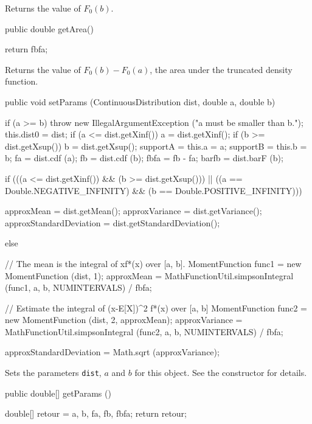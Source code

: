 \begin{tabb}   Returns the value of $F_0(b)$.
\end{tabb}
\begin{code}

   public double getArea()\begin{hide} {
      return fbfa;
   }
\end{hide}
\end{code}
\begin{tabb}  Returns the value of $F_0(b) - F_0(a)$,
  the area under the truncated density function.
\end{tabb}
\begin{code}

   public void setParams (ContinuousDistribution dist, double a, double b)\begin{hide} {
      if (a >= b)
         throw new IllegalArgumentException ("a must be smaller than b.");
      this.dist0 = dist;
      if (a <= dist.getXinf())
         a = dist.getXinf();
      if (b >= dist.getXsup())
         b = dist.getXsup();
      supportA = this.a = a;
      supportB = this.b = b;
      fa = dist.cdf (a);
      fb = dist.cdf (b);
      fbfa = fb - fa;
      barfb = dist.barF (b);

      if (((a <= dist.getXinf()) && (b >= dist.getXsup())) ||
       ((a == Double.NEGATIVE_INFINITY) && (b == Double.POSITIVE_INFINITY))) {
         approxMean = dist.getMean();
         approxVariance = dist.getVariance();
         approxStandardDeviation = dist.getStandardDeviation();

      } else {
         // The mean is the integral of xf*(x) over [a, b].
         MomentFunction func1 = new MomentFunction (dist, 1);
         approxMean = MathFunctionUtil.simpsonIntegral (func1, a, b, NUMINTERVALS) / fbfa;

         // Estimate the integral of (x-E[X])^2 f*(x) over [a, b]
         MomentFunction func2 = new MomentFunction (dist, 2, approxMean);
         approxVariance = MathFunctionUtil.simpsonIntegral (func2, a, b, NUMINTERVALS) / fbfa;

         approxStandardDeviation = Math.sqrt (approxVariance);
      }
   }\end{hide}
\end{code}
\begin{tabb}  Sets the parameters \texttt{dist}, $a$ and $b$ for this object. See the
  constructor for details.
\end{tabb}
\begin{code}

   public double[] getParams ()\begin{hide} {
      double[] retour = {a, b, fa, fb, fbfa};
      return retour;
   }\end{hide}
\end{code}
